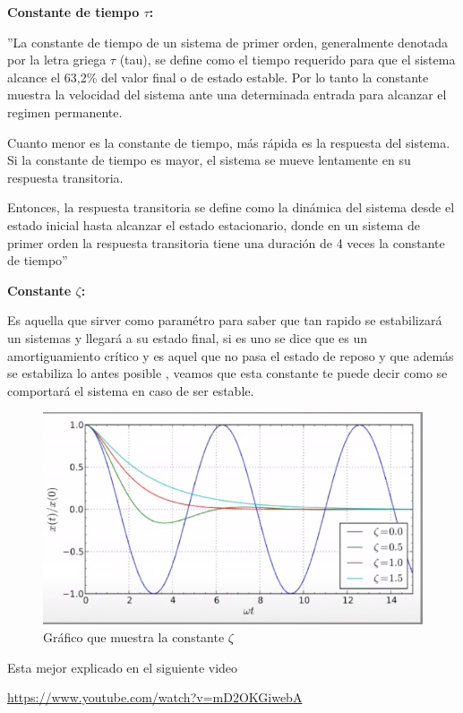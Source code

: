 \textbf{Constante de tiempo $ \tau $:}

''La constante de tiempo de un sistema de primer orden, generalmente denotada por la letra griega $ \tau $ (tau), se define como el tiempo requerido para que el sistema alcance el 63,2\% del valor final o de estado estable. Por lo tanto la constante muestra la velocidad del sistema ante una determinada entrada para alcanzar el regimen permanente.

Cuanto menor es la constante de tiempo, más rápida es la respuesta del sistema. Si la constante de tiempo es mayor, el sistema se mueve lentamente en su respuesta transitoria.

Entonces, la respuesta transitoria se define como la dinámica del sistema desde el estado inicial hasta alcanzar el estado estacionario, donde en un sistema de primer orden la respuesta transitoria tiene una duración de 4 veces la constante de tiempo''


\textbf{Constante \textbf{$\zeta$}:}

Es aquella que sirver como paramétro para saber que tan rapido se estabilizará un sistemas y llegará a su estado final, si es uno se dice que es un amortiguamiento crítico y es aquel que no pasa el estado de reposo y que además se estabiliza lo antes posible , veamos que esta constante te puede decir como se comportará el sistema en caso de ser estable.


\begin{figure}[H]
	\centering
	\includegraphics[width=0.7\linewidth]{img/S1}
	\caption{Gráfico que muestra la constante $\zeta$}
	\label{fig:s1}
\end{figure}


Esta mejor explicado en el siguiente video

\url{https://www.youtube.com/watch?v=mD2OKGiwebA}

